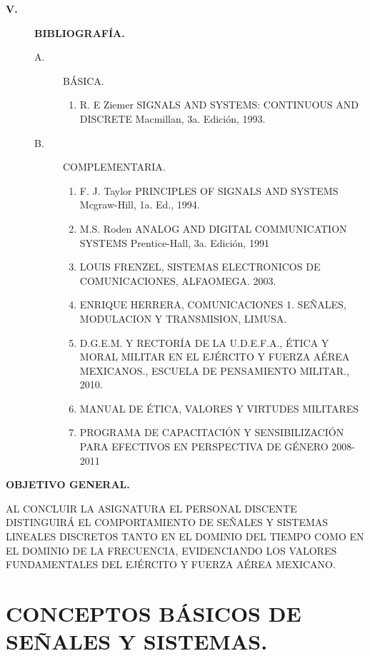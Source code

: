 \documentclass{myarticle}
\begin{document}
\begin{description}
\eject
\item[{\large{\bf V.}}] {\large{\bf BIBLIOGRAFÍA.}}
\begin{description}
\item[A.] BÁSICA.
\begin{enumerate}
\item R. E Ziemer SIGNALS AND SYSTEMS: CONTINUOUS AND DISCRETE 
Macmillan, 3a. Edición, 1993.
\end{enumerate}
\item[B.] COMPLEMENTARIA.
\begin{enumerate}
\item F. J. Taylor PRINCIPLES OF SIGNALS AND SYSTEMS Mcgraw-Hill, 1a. Ed., 
1994. 
\item M.S. Roden ANALOG AND DIGITAL COMMUNICATION SYSTEMS Prentice-Hall, 
3a. Edición, 1991 
\item LOUIS FRENZEL, SISTEMAS ELECTRONICOS DE COMUNICACIONES, ALFAOMEGA. 
2003.
\item ENRIQUE HERRERA, COMUNICACIONES 1. SEÑALES, MODULACION Y 
TRANSMISION, LIMUSA.
\item D.G.E.M. Y RECTORÍA DE LA U.D.E.F.A., ÉTICA Y MORAL MILITAR EN EL 
EJÉRCITO Y FUERZA AÉREA MEXICANOS., ESCUELA DE PENSAMIENTO MILITAR., 2010.
\item MANUAL DE ÉTICA, VALORES Y VIRTUDES MILITARES
\item PROGRAMA DE CAPACITACIÓN Y SENSIBILIZACIÓN PARA EFECTIVOS EN 
PERSPECTIVA DE GÉNERO 2008-2011
\end{enumerate}
\end{description}
\end{description}
\eject
\begin{center}
{\bf OBJETIVO GENERAL.}
\end{center}
\noindent
AL CONCLUIR LA ASIGNATURA EL PERSONAL DISCENTE DISTINGUIRÁ EL COMPORTAMIENTO 
DE SEÑALES Y SISTEMAS LINEALES DISCRETOS TANTO EN EL DOMINIO DEL TIEMPO 
COMO EN EL DOMINIO DE LA FRECUENCIA, EVIDENCIANDO LOS VALORES FUNDAMENTALES 
DEL EJÉRCITO Y FUERZA AÉREA MEXICANO.

\eject
\tableofcontents

\eject
\section{CONCEPTOS BÁSICOS DE SEÑALES Y SISTEMAS.}


\end{document}
